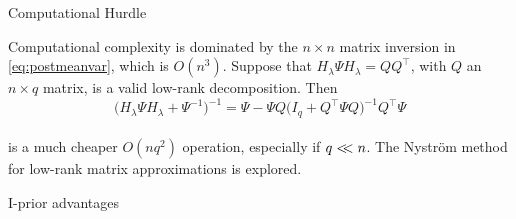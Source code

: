 \documentclass{beamer}
\newlength{\onecolwid}
\newlength{\twocolwid}
\begin{document}
\begin{frame}[t]
\begin{columns}[t]
\begin{column}{\twocolwid}
\begin{columns}[t,totalwidth=\twocolwid]  %
\begin{column}{\onecolwid}  %



\begin{block}{Computational Hurdle}

Computational complexity is dominated by the $n \times n$ matrix inversion in \eqref{eq:postmeanvar}, which is $O(n^3)$. Suppose that $H_\lambda \Psi H_\lambda = QQ^\top$, with $Q$ an $n \times q$ matrix, is a valid low-rank decomposition. Then
~\\[-18pt]
\[
  \big(H_\lambda \Psi H_\lambda + \Psi^{-1}\big)^{-1} = \Psi - \Psi Q \big(I_q + Q^\top \Psi Q\big)^{-1} Q^\top \Psi
\]
~\\[-28pt]
is a much cheaper $O(nq^2)$ operation, especially if $q <\!\!< n$. The Nyström method for low-rank matrix approximations is explored.

\end{block}



\begin{alertblock}{I-prior advantages}


\end{alertblock}
\end{column}
\end{columns}
\end{column}
\end{columns}
\end{frame}
\end{document}
